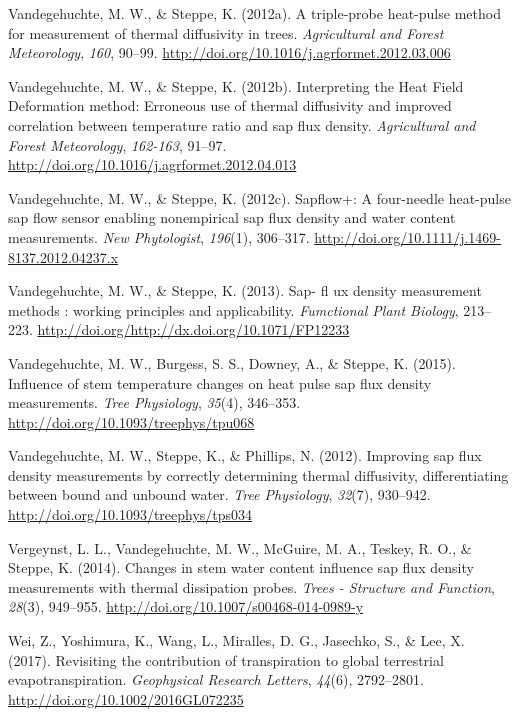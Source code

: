 \documentclass[11pt,twoside]{reedthesis}
\begin{document}
\hypertarget{ref-Vandegehuchte2012}{}
Vandegehuchte, M. W., \& Steppe, K. (2012a). A triple-probe heat-pulse
method for measurement of thermal diffusivity in trees.
\emph{Agricultural and Forest Meteorology}, \emph{160}, 90--99.
\url{http://doi.org/10.1016/j.agrformet.2012.03.006}

\hypertarget{ref-Vandegehuchte2012a}{}
Vandegehuchte, M. W., \& Steppe, K. (2012b). Interpreting the Heat Field
Deformation method: Erroneous use of thermal diffusivity and improved
correlation between temperature ratio and sap flux density.
\emph{Agricultural and Forest Meteorology}, \emph{162-163}, 91--97.
\url{http://doi.org/10.1016/j.agrformet.2012.04.013}

\hypertarget{ref-Vandegehuchte2012c}{}
Vandegehuchte, M. W., \& Steppe, K. (2012c). Sapflow+: A four-needle
heat-pulse sap flow sensor enabling nonempirical sap flux density and
water content measurements. \emph{New Phytologist}, \emph{196}(1),
306--317. \url{http://doi.org/10.1111/j.1469-8137.2012.04237.x}

\hypertarget{ref-Vandegehuchte2013}{}
Vandegehuchte, M. W., \& Steppe, K. (2013). Sap- fl ux density
measurement methods : working principles and applicability.
\emph{Fumctional Plant Biology}, 213--223.
\url{http://doi.org/http://dx.doi.org/10.1071/FP12233}

\hypertarget{ref-Vandegehuchte2015}{}
Vandegehuchte, M. W., Burgess, S. S., Downey, A., \& Steppe, K. (2015).
Influence of stem temperature changes on heat pulse sap flux density
measurements. \emph{Tree Physiology}, \emph{35}(4), 346--353.
\url{http://doi.org/10.1093/treephys/tpu068}

\hypertarget{ref-Vandegehuchte2012b}{}
Vandegehuchte, M. W., Steppe, K., \& Phillips, N. (2012). Improving sap
flux density measurements by correctly determining thermal diffusivity,
differentiating between bound and unbound water. \emph{Tree Physiology},
\emph{32}(7), 930--942. \url{http://doi.org/10.1093/treephys/tps034}

\hypertarget{ref-Vergeynst2014}{}
Vergeynst, L. L., Vandegehuchte, M. W., McGuire, M. A., Teskey, R. O.,
\& Steppe, K. (2014). Changes in stem water content influence sap flux
density measurements with thermal dissipation probes. \emph{Trees -
Structure and Function}, \emph{28}(3), 949--955.
\url{http://doi.org/10.1007/s00468-014-0989-y}

\hypertarget{ref-Wei2017}{}
Wei, Z., Yoshimura, K., Wang, L., Miralles, D. G., Jasechko, S., \& Lee,
X. (2017). Revisiting the contribution of transpiration to global
terrestrial evapotranspiration. \emph{Geophysical Research Letters},
\emph{44}(6), 2792--2801. \url{http://doi.org/10.1002/2016GL072235}
\end{document}
